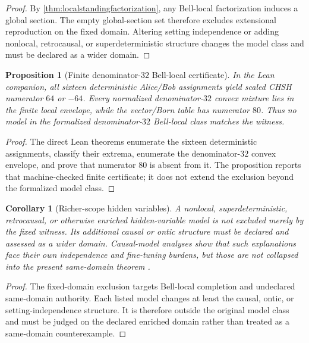 \documentclass[11pt]{article}
\newtheorem{proposition}[theorem]{Proposition}
\newtheorem{corollary}[theorem]{Corollary}
\theoremstyle{definition}
\begin{document}
\begin{proof}
By \cref{thm:localstandingfactorization}, any Bell-local factorization induces a global section. The empty global-section set therefore excludes extensional reproduction on the fixed domain. Altering setting independence or adding nonlocal, retrocausal, or superdeterministic structure changes the model class and must be declared as a wider domain.
\end{proof}

\begin{proposition}[Finite denominator-$32$ Bell-local certificate]\label{prop:finitebelllocal}
In the Lean companion, all sixteen deterministic Alice/Bob assignments yield scaled CHSH numerator $64$ or $-64$. Every normalized denominator-$32$ convex mixture lies in the finite local envelope, while the vector/Born table has numerator $80$. Thus no model in the formalized denominator-$32$ Bell-local class matches the witness.
\end{proposition}

\begin{proof}
The direct Lean theorems enumerate the sixteen deterministic assignments, classify their extrema, enumerate the denominator-$32$ convex envelope, and prove that numerator $80$ is absent from it. The proposition reports that machine-checked finite certificate; it does not extend the exclusion beyond the formalized model class.
\end{proof}

\begin{corollary}[Richer-scope hidden variables]
A nonlocal, superdeterministic, retrocausal, or otherwise enriched hidden-variable model is not excluded merely by the fixed witness. Its additional causal or ontic structure must be declared and assessed as a wider domain. Causal-model analyses show that such explanations face their own independence and fine-tuning burdens, but those are not collapsed into the present same-domain theorem \cite{WoodSpekkens2015,Cavalcanti2018}.
\end{corollary}

\begin{proof}
The fixed-domain exclusion targets Bell-local completion and undeclared same-domain authority. Each listed model changes at least the causal, ontic, or setting-independence structure. It is therefore outside the original model class and must be judged on the declared enriched domain rather than treated as a same-domain counterexample.
\end{proof}
\end{document}
